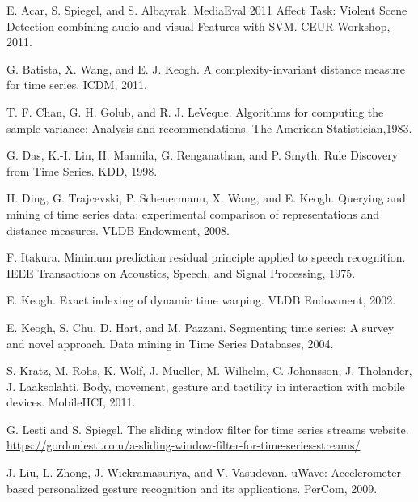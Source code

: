 \begin{thebibliography}{11} 
    
    E. Acar, S. Spiegel, and S. Albayrak. 
    MediaEval 2011 Affect Task: Violent Scene Detection combining audio and visual Features with SVM. 
	CEUR Workshop, 2011.

    G. Batista, X. Wang, and E. J. Keogh. 
    A complexity-invariant distance measure for time series. 
	ICDM, 2011.
        
    T. F. Chan, G. H. Golub, and R. J. LeVeque. 
    Algorithms for computing the sample variance: Analysis and recommendations.
	The American Statistician,1983.
        
    G. Das, K.-I. Lin, H. Mannila, G. Renganathan, and P. Smyth. 
    Rule Discovery from Time Series.
	KDD, 1998.
        
    H. Ding, G. Trajcevski, P. Scheuermann, X. Wang, and E. Keogh. 
    Querying and mining of time series data: experimental comparison of representations and distance measures.
	VLDB Endowment, 2008.
    
    F. Itakura. 
    Minimum prediction residual principle applied to speech recognition. 
    IEEE Transactions on Acoustics, Speech, and Signal Processing, 1975.

    E. Keogh. 
    Exact indexing of dynamic time warping. 
    VLDB Endowment, 2002.

	E. Keogh, S. Chu, D. Hart, and M. Pazzani. 
	Segmenting time series: A survey and novel approach. 
	Data mining in Time Series Databases, 2004.
	
	S. Kratz, M. Rohs, K. Wolf, J. Mueller, M. Wilhelm, C. Johansson, J. Tholander, J. Laaksolahti.
	Body, movement, gesture and tactility in interaction with mobile devices.	
	MobileHCI, 2011.	
	
	G. Lesti and S. Spiegel.
	The sliding window filter for time series streams website.
	\url{https://gordonlesti.com/a-sliding-window-filter-for-time-series-streams/}	
	
    J. Liu, L. Zhong, J. Wickramasuriya, and V. Vasudevan. 
    uWave: Accelerometer-based personalized gesture recognition and its applications. 
    PerCom, 2009.


\end{thebibliography}

